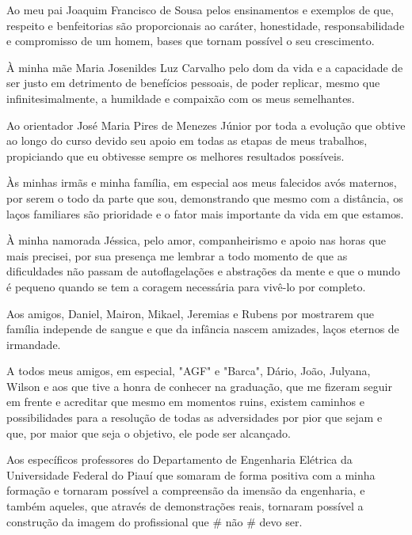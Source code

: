 Ao meu pai Joaquim Francisco de Sousa pelos ensinamentos e exemplos de que, respeito e benfeitorias são proporcionais ao caráter, honestidade, responsabilidade e compromisso de um homem, bases que tornam possível o seu crescimento.

À minha mãe Maria Josenildes Luz Carvalho pelo dom da vida e a capacidade de ser justo em detrimento de benefícios pessoais, de poder replicar, mesmo que infinitesimalmente, a humildade e compaixão com os meus semelhantes.

Ao orientador José Maria Pires de Menezes Júnior por toda a evolução que obtive ao longo do curso devido seu apoio em todas as etapas de meus trabalhos, propiciando que eu obtivesse sempre os melhores resultados possíveis.

Às minhas irmãs e minha família, em especial aos meus falecidos avós maternos, por serem o todo da parte que sou, demonstrando que mesmo com a distância, os laços familiares são prioridade e o fator mais importante da vida em que estamos.

À minha namorada Jéssica, pelo amor, companheirismo e apoio nas horas que mais precisei, por sua presença me lembrar a todo momento de que as dificuldades não passam de autoflagelações e abstrações da mente e que o mundo é pequeno quando se tem a coragem necessária para vivê-lo por completo.

Aos amigos, Daniel, Mairon, Mikael, Jeremias e Rubens por mostrarem que família independe de sangue e que da infância nascem amizades, laços eternos de irmandade.

A todos meus amigos, em especial, "AGF" e "Barca", Dário, João, Julyana, Wilson e aos que tive a honra de conhecer na graduação, que me fizeram seguir em frente e acreditar que mesmo em momentos ruins, existem caminhos e possibilidades para a resolução de todas as adversidades por pior que sejam e que, por maior que seja o objetivo, ele pode ser alcançado.

Aos específicos professores do Departamento de Engenharia Elétrica da Universidade Federal do Piauí que somaram de forma positiva com a minha formação e tornaram possível a compreensão da imensão da engenharia, e também aqueles, que através de demonstrações reais, tornaram possível a construção da imagem do profissional que \# não \# devo ser.